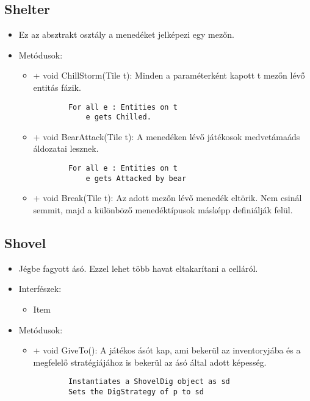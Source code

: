 \subsection{Shelter}
\begin{itemize}
	\item Ez az absztrakt osztály a menedéket jelképezi egy mezőn.
	\item Metódusok:
	\begin{itemize}
		\item + void ChillStorm(Tile t): Minden a paraméterként kapott t mezőn lévő entitás fázik.
		\begin{lstlisting}
		For all e : Entities on t
			e gets Chilled.
		\end{lstlisting}
		\item + void BearAttack(Tile t): A menedéken lévő játékosok medvetámaáds áldozatai lesznek.
		\begin{lstlisting}
		For all e : Entities on t
			e gets Attacked by bear
		\end{lstlisting}
		\item + void Break(Tile t): Az adott mezőn lévő menedék eltörik. Nem csinál semmit, majd a különböző menedéktípusok másképp definiálják felül.
	\end{itemize}
\end{itemize}

\subsection{Shovel}
\begin{itemize}
	\item Jégbe fagyott ásó. Ezzel lehet több havat eltakarítani a celláról.
	\item Interfészek:
	\begin{itemize}
		\item Item
	\end{itemize}
	\item Metódusok:
	\begin{itemize}
		\item + void GiveTo(): A játékos ásót kap, ami bekerül az inventoryjába és a megfelelő stratégiájához is bekerül az ásó által adott képesség.
		\begin{lstlisting}
		Instantiates a ShovelDig object as sd
		Sets the DigStrategy of p to sd
		\end{lstlisting}
	\end{itemize}
\end{itemize}

